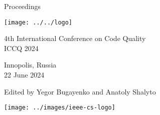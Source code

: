\thispagestyle{empty}
\begin{center}
Proceedings

\vspace{1in}

\texttt{[image: ../../logo]}

\vspace{0.5in}

{\Large 4th International Conference on Code Quality\\[12pt]
ICCQ 2024}

\vspace{0.5in}

Innopolis, Russia\\
22 June 2024

\vspace{0.5in}

Edited by Yegor Bugayenko and Anatoly Shalyto

\vspace{1.5in}




\texttt{[image: ../images/ieee-cs-logo]}

\end{center}


